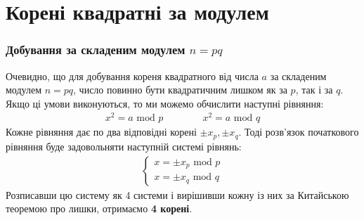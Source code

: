 \documentclass{../zkdl-presentation-template}
\begin{document}
\section{Корені квадратні за модулем}
\begin{frame}
    \frametitle{Добування за складеним модулем $n=pq$}
    Очевидно, що для добування кореня квадратного від числа $a$ за складеним модулем $n=pq$, число повинно бути квадратичним лишком як за $p$, так і за $q$. Якщо ці умови виконуються, то ми можемо обчислити наступні рівняння:
    \begin{gather*}
        x^2=a\text{ mod }p \qquad\qquad x^2=a\text{ mod }q
    \end{gather*}
    Кожне рівняння дає по два відповідні корені $\pm x_p, \pm x_q$. Тоді розв'язок початкового рівняння буде задовольняти наступній системі рівнянь:
    \begin{align*}
         \left\{ \begin{array}{r}
x=\pm x_p \text{ mod } p  \\ 
x=\pm x_q \text{ mod } q 
\end{array}\right.
    \end{align*}
    Розписавши цю систему як 4 системи і вирішивши кожну із них за Китайською теоремою про лишки, отримаємо \textbf{4 корені}.
    
\end{frame}
\end{document}
